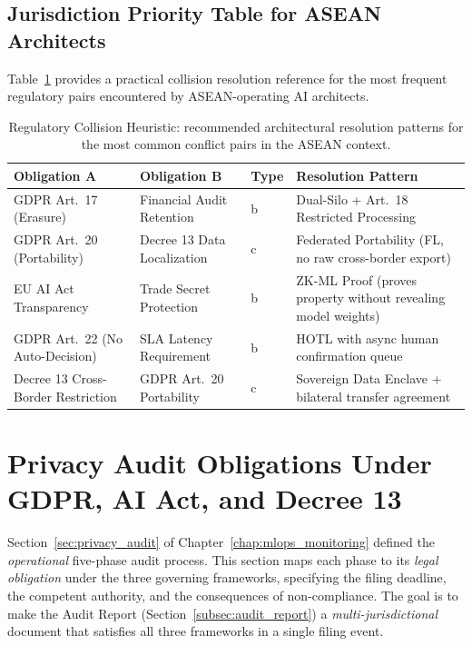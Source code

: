 \subsection{Jurisdiction Priority Table for ASEAN Architects}
\label{sec:jurisdiction_priority}

Table~\ref{tab:jurisdiction_heuristic} provides a practical collision resolution reference for the most frequent regulatory pairs encountered by ASEAN-operating AI architects.

\begin{table}[ht]
\centering
\caption{Regulatory Collision Heuristic: recommended architectural resolution patterns for the most common conflict pairs in the ASEAN context.}
\label{tab:jurisdiction_heuristic}
\renewcommand{\arraystretch}{1.4}
\begin{tabular}{p{3.2cm} p{3.2cm} p{2.0cm} p{3.8cm}}
\toprule
\textbf{Obligation A} & \textbf{Obligation B} & \textbf{Type} & \textbf{Resolution Pattern} \\
\midrule
GDPR Art.~17 (Erasure) &
Financial Audit Retention &
b &
Dual-Silo + Art.~18 Restricted Processing \\

GDPR Art.~20 (Portability) &
Decree 13 Data Localization &
c &
Federated Portability (FL, no raw cross-border export) \\

EU AI Act Transparency &
Trade Secret Protection &
b &
ZK-ML Proof (proves property without revealing model weights) \\

GDPR Art.~22 (No Auto-Decision) &
SLA Latency Requirement &
b &
HOTL with async human confirmation queue \\

Decree 13 Cross-Border Restriction &
GDPR Art.~20 Portability &
c &
Sovereign Data Enclave + bilateral transfer agreement \\
\bottomrule
\end{tabular}
\end{table}

\section{Privacy Audit Obligations Under GDPR, AI Act, and Decree 13}
\label{sec:privacy_audit_obligations}

Section~\ref{sec:privacy_audit} of Chapter~\ref{chap:mlops_monitoring} defined the \emph{operational} five-phase audit process. This section maps each phase to its \emph{legal obligation} under the three governing frameworks, specifying the filing deadline, the competent authority, and the consequences of non-compliance. The goal is to make the Audit Report (Section~\ref{subsec:audit_report}) a \emph{multi-jurisdictional} document that satisfies all three frameworks in a single filing event.

